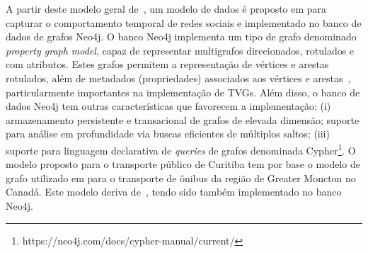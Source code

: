 \textcolor{courb2020}{
A partir deste modelo geral de~\cite{sant:12}, um modelo de dados é proposto em \cite{cat:13} para capturar o comportamento temporal de redes sociais e implementado no banco de dados de grafos Neo4j. O banco Neo4j implementa um tipo de grafo denominado \emph{property graph model}, capaz de representar multigrafos direcionados, rotulados e com atributos. Estes grafos permitem a representação de vértices e arestas rotulados, além de metadados (propriedades) associados aos vértices e arestas~\cite{rod:10}, particularmente importantes na implementação de TVGs. Além disso, o banco de dados Neo4j tem outras características que favorecem a implementação: (i) armazenamento persistente e transacional de grafos de elevada dimensão; suporte para análise em profundidade via buscas eficientes de múltiplos saltos; (iii) suporte para linguagem declarativa de \emph{queries} de grafos denominada Cypher\footnote{https://neo4j.com/docs/cypher-manual/current/}.
}
\textcolor{courb2020}{
O modelo proposto para o transporte público de Curitiba tem por base o modelo de grafo utilizado em \cite{wach:19} para o transporte de ônibus da região de Greater Moncton no Canadá. Este modelo deriva de~\cite{cat:13}, tendo sido também implementado no banco Neo4j.
}

